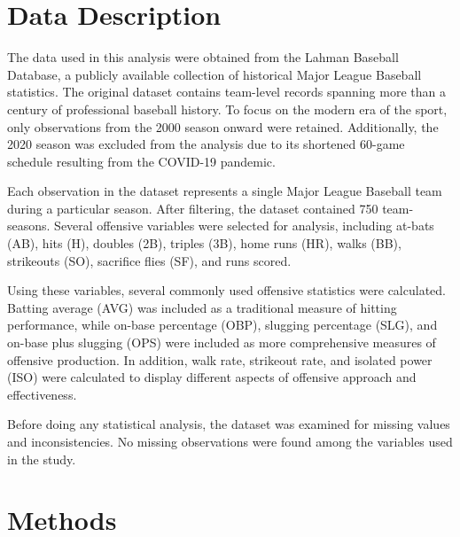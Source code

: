 \documentclass{article}
\begin{document}
\vspace{20pt}

\section{Data Description}

\hspace{12pt} The data used in this analysis were obtained from the Lahman Baseball Database, a publicly available collection of historical Major League Baseball 
statistics. The original dataset contains team-level records spanning more than a century of professional baseball history. To focus on the modern era of the 
sport, only observations from the 2000 season onward were retained. Additionally, the 2020 season was excluded from the analysis due to its shortened 60-game 
schedule resulting from the COVID-19 pandemic.

\vspace{5pt}

Each observation in the dataset represents a single Major League Baseball team during a particular season. After filtering, the dataset contained 750 team-seasons. 
Several offensive variables were selected for analysis, including at-bats (AB), hits (H), doubles (2B), triples (3B), home runs (HR), walks (BB), strikeouts (SO), 
sacrifice flies (SF), and runs scored. 

\vspace{5pt}

Using these variables, several commonly used offensive statistics were calculated. Batting average (AVG) was included as a traditional measure of hitting 
performance, while on-base percentage (OBP), slugging percentage (SLG), and on-base plus slugging (OPS) were included as more comprehensive measures of offensive 
production. In addition, walk rate, strikeout rate, and isolated power (ISO) were calculated to display different aspects of offensive approach and effectiveness.

\vspace{5pt}

Before doing any statistical analysis, the dataset was examined for missing values and inconsistencies. No missing observations were found among the variables used 
in the study.

\vspace{20pt}

\section{Methods}
\end{document}

